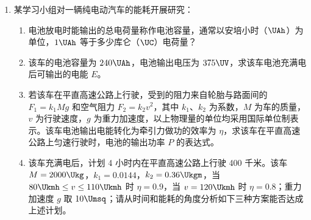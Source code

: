 \documentclass[\gkver]{gaokaozhenti}
\begin{document}
\begin{enumerate}

\item
某学习小组对一辆纯电动汽车的能耗开展研究：

\begin{enumerate}
	\item
	电池放电时能输出的总电荷量称作电池容量，通常以安培小时（$\UAh$）为单位，$1\UAh$ 等于多少库仑（$\UC$）电荷量？
	\item
	该车的电池容量为 $240 \UAh$，电池输出电压为 $375 \UV$，求该车电池充满电后可输出的电能 $E$。
	\item
	若该车在平直高速公路上行驶，受到的阻力来自轮胎与路面间的 $F_{1} = k_{1}Mg$ 和空气阻力 $F_{2} = k_{2}v^{2}$，其中 $k_{1}$、$k_{2}$ 为系数，$M$ 为车的质量，$v$ 为行驶速度，$g$ 为重力加速度，以上物理量的单位均采用国际单位制表示。该车电池输出电能转化为牵引力做功的效率为 $\eta$，求该车在平直高速公路上匀速行驶时，电池的输出功率 $P$ 的表达式。
	\item
	该车充满电后，计划 4 小时内在平直高速公路上行驶 400 千米。该车 $M = 2000 \Ukg$，$k_{1} = 0.0144$，$k_{2} = 0.36 \Ukgm$，当 $80 \Ukmh \leq v \leq 110 \Ukmh$ 时 $\eta = 0.9$，当 $v = 120 \Ukmh$ 时 $\eta = 0.8$；重力加速度 $g$ 取 $10 \Umsq$；请从时间和能耗的角度分析如下三种方案能否达成上述计划。


\end{enumerate}
\end{enumerate}
\end{document}
